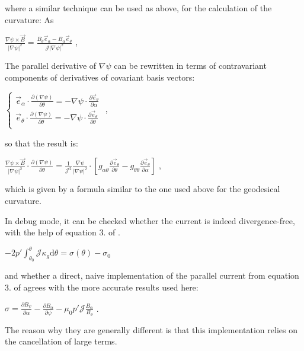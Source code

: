 where a similar technique can be used as above, for the calculation of the curvature\+: As

$\frac{\nabla \psi \times \vec{B}}{\left|\nabla \psi\right|^2} = \frac{B_\theta \vec{e}_\alpha - B_\alpha \vec{e}_\theta} {\mathcal{J} \left|\nabla\psi\right|^2}$ ,

The parallel derivative of $\nabla \psi$ can be rewritten in terms of contravariant components of derivatives of covariant basis vectors\+:

$\left\{ \begin{aligned} \vec{e}_\alpha \cdot \frac{\partial \left(\nabla \psi\right)}{\partial\theta} = - \nabla \psi \cdot \frac{\partial \vec{e}_\theta}{\partial \alpha} \\ \vec{e}_\theta \cdot \frac{\partial \left(\nabla \psi\right)}{\partial\theta} = - \nabla \psi \cdot \frac{\partial \vec{e}_\theta}{\partial \theta} \\ \end{aligned}\right. $ ,

so that the result is\+:

$\frac{\nabla \psi \times \vec{B}}{\left|\nabla \psi\right|^2} \cdot \frac{\partial \left(\nabla \psi\right)}{\partial \theta} = \frac{1}{\mathcal{J}^2} \frac{\nabla \psi}{\left|\nabla\psi\right|^2} \cdot \left[ g_{\alpha\theta} \frac{\partial \vec{e}_\theta}{\partial \theta} - g_{\theta\theta} \frac{\partial \vec{e}_\theta}{\partial \alpha} \right] $ ,

which is given by a formula similar to the one used above for the geodesical curvature.

In debug mode, it can be checked whether the current is indeed divergence-\/free, with the help of equation 3. of \cite{Weyens3D}.

$ -2 p' \int_{\theta_0}^\theta \mathcal{J} \kappa_g \text{d}{\theta} = \sigma\left(\theta\right) - \sigma_0$

and whether a direct, naive implementation of the parallel current from equation 3. of \cite{Weyens3D} agrees with the more accurate results used here\+:

$\sigma = \frac{\partial B_\psi}{\partial \alpha} - \frac{\partial B_\alpha}{\partial \psi} - \mu_0 p' \mathcal{J} \frac{B_\alpha}{B_\theta}$ .

The reason why they are generally different is that this implementation relies on the cancellation of large terms.


